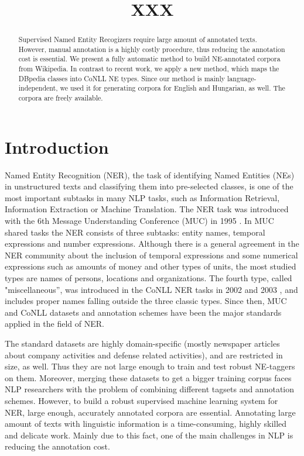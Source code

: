 \documentclass[11pt]{article}
\title{XXX}
\date{}
\begin{document}
\maketitle
\begin{abstract}

Supervised Named Entity Recogizers require large amount of annotated texts. However, manual annotation is a highly costly procedure, thus reducing the annotation cost is essential. We present a fully automatic method to build NE-annotated corpora from Wikipedia. In contrast to recent work, we apply a new method, which maps the DBpedia classes into CoNLL NE types. Since our method is mainly language-independent, we used it for generating corpora for English and Hungarian, as well. The corpora are freely available. 

\end{abstract}

\section{Introduction}
\label{sec:intro}

Named Entity Recognition (NER), the task of identifying Named Entities (NEs) in unstructured texts and classifying them into pre-selected classes, is one of the most important subtasks in many NLP tasks, such as Information Retrieval, Information Extraction or Machine Translation. The NER task was introduced with the 6th Message Understanding Conference (MUC) in 1995 \cite{Grishman:96}. In MUC shared tasks the NER consists of three subtasks: entity names, temporal expressions and number expressions. Although there is a general agreement in the NER community about the inclusion of temporal expressions and some numerical expressions such as amounts of money and other types of units, the most studied types are names of persons, locations and organizations. The fourth type, called "miscellaneous'', was introduced in the CoNLL NER tasks in 2002 \cite{Tjong:02} and 2003 \cite{Tjong:03}, and includes proper names falling outside the three classic types. Since then, MUC and CoNLL datasets and annotation schemes have been the major standards applied in the field of NER. 

The standard datasets are highly domain-specific (mostly newspaper articles about company activities and defense related activities), and are restricted in size, as well. Thus they are not large enough to train and test robust NE-taggers on them. Moreover, merging these datasets to get a bigger training corpus faces NLP researchers with the problem of combining different tagsets and annotation schemes. However, to build a robust supervised machine learning system for NER, large enough, accurately annotated corpora are essential. Annotating large amount of texts with linguistic information is a time-consuming, highly skilled and delicate work. Mainly due to this fact, one of the main challenges in NLP is reducing the annotation cost. 
\end{document}
